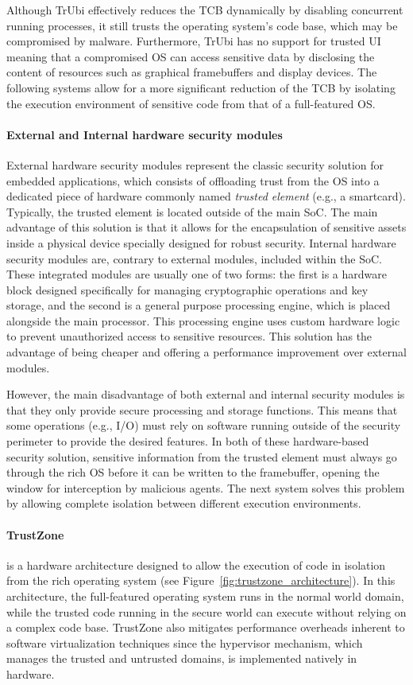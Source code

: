 Although TrUbi effectively reduces the TCB dynamically by disabling concurrent running processes, it still trusts the operating system's code base, which may be compromised by malware. Furthermore, TrUbi has no support for trusted UI meaning that a compromised OS can access sensitive data by disclosing the content of resources such as graphical framebuffers and display devices. The following systems allow for a more significant reduction of the TCB by isolating the execution environment of sensitive code from that of a full-featured OS.

\paragraph{\textbf{External and Internal hardware security modules}} External hardware security modules represent the classic security solution for embedded applications, which consists of offloading trust from the OS into a dedicated piece of hardware commonly named \emph{trusted element} (e.g., a smartcard). Typically, the trusted element is located outside of the main \ac{SoC}. The main advantage of this solution is that it allows for the encapsulation of sensitive assets inside a physical device specially designed for robust security. Internal hardware security modules are, contrary to external modules, included within the \ac{SoC}. These integrated modules are usually one of two forms: the first is a hardware block designed specifically for managing cryptographic operations and key storage, and the second is a general purpose processing engine, which is placed alongside the main processor. This processing engine uses custom hardware logic to prevent unauthorized access to sensitive resources. This solution has the advantage of being cheaper and offering a performance improvement over external modules.

However, the main disadvantage of both external and internal security modules is that they only provide secure processing and storage functions. This means that some operations (e.g., I/O) must rely on software running outside of the security perimeter to provide the desired features. In both of these hardware-based security solution, sensitive information from the trusted element must always go through the rich OS before it can be written to the framebuffer, opening the window for interception by malicious agents. The next system solves this problem by allowing complete isolation between different execution environments.

\paragraph{\textbf{TrustZone}} is a hardware architecture designed to allow the execution of code in isolation from the rich operating system (see Figure~\ref{fig:trustzone_architecture}). In this architecture, the full-featured operating system runs in the normal world domain, while the trusted code running in the secure world can execute without relying on a complex code base. TrustZone also mitigates performance overheads inherent to software virtualization techniques since the hypervisor mechanism, which manages the trusted and untrusted domains, is implemented natively in hardware.

